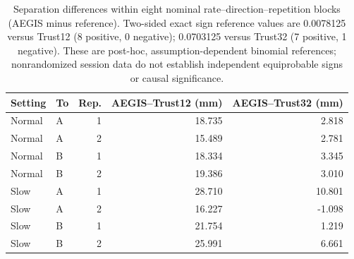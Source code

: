 \begin{table}[H]
\centering
\small
\caption{Separation differences within eight nominal rate--direction--repetition blocks (AEGIS minus reference). Two-sided exact sign reference values are 0.0078125 versus Trust12 (8 positive, 0 negative); 0.0703125 versus Trust32 (7 positive, 1 negative). These are post-hoc, assumption-dependent binomial references; nonrandomized session data do not establish independent equiprobable signs or causal significance.}
\label{tab:nominal-pairs}
\begin{tabular}{llrrr}
\toprule
Setting & To & Rep. & AEGIS--Trust12 (mm) & AEGIS--Trust32 (mm) \\
\midrule
Normal & A & 1 & 18.735 & 2.818 \\
Normal & A & 2 & 15.489 & 2.781 \\
Normal & B & 1 & 18.334 & 3.345 \\
Normal & B & 2 & 19.386 & 3.010 \\
Slow & A & 1 & 28.710 & 10.801 \\
Slow & A & 2 & 16.227 & -1.098 \\
Slow & B & 1 & 21.754 & 1.219 \\
Slow & B & 2 & 25.991 & 6.661 \\
\bottomrule
\end{tabular}
\end{table}
